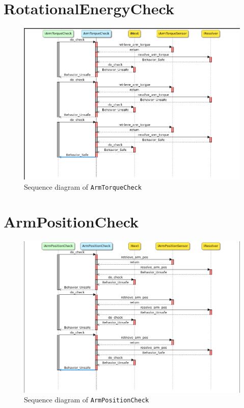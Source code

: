 \documentclass[12pt]{scrreprt}
\begin{document}
\begin{appendices}
\section{RotationalEnergyCheck}
\label{aRotationalEnergyCheck}

\begin{figure}[H]
    \centering
    \includegraphics[width=\textwidth]{Figures/results/modelling_figures/ArmTorqueCheck/ArmTorqueCheck_seq.png}
    \caption{Sequence diagram of \texttt{ArmTorqueCheck}}
    \label{fig:ArmTorqueCheck_seq}
\end{figure}



\section{ArmPositionCheck}
\label{aArmPositionCheck}

\begin{figure}[H]
    \centering
    \includegraphics[width=\textwidth]{Figures/results/modelling_figures/ArmPositionCheck/ArmPositionCheck_seq.png}
    \caption{Sequence diagram of \texttt{ArmPositionCheck}}
    \label{fig:ArmPositionCheck_seq}
\end{figure}


\end{appendices}
\end{document}
